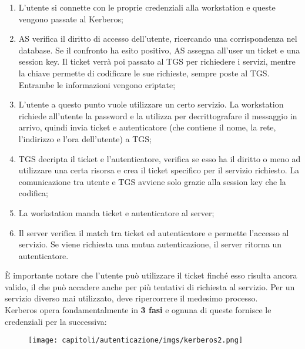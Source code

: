 \begin{enumerate}
      \item L'utente si connette con le proprie credenziali alla workstation e
            queste vengono passate al Kerberos;
      \item AS verifica il diritto di accesso dell'utente, ricercando una
            corrispondenza nel database. Se il confronto ha esito positivo, AS
            assegna all'user un ticket e una session key.
            Il ticket verrà poi passato al TGS per richiedere i servizi, mentre
            la chiave permette di codificare le sue richieste, sempre poste al TGS.
            Entrambe le informazioni vengono criptate;
      \item L'utente a questo punto vuole utilizzare un certo servizio.
            La workstation richiede all'utente la password e la utilizza per
            decrittografare il messaggio in arrivo, quindi invia ticket e
            autenticatore
            (che contiene il nome, la rete, l'indirizzo e l'ora dell'utente) a TGS;
      \item TGS decripta il ticket e l'autenticatore, verifica se esso ha il
            diritto o meno ad utilizzare una certa risorsa e crea il ticket
            specifico per il servizio richiesto. La comunicazione tra utente e
            TGS avviene solo grazie alla session key che la codifica;
      \item La workstation manda ticket e autenticatore al server;
      \item Il server verifica il match tra ticket ed autenticatore e permette
            l'accesso al servizio. Se
            viene richiesta una mutua autenticazione, il server ritorna un
            autenticatore.
\end{enumerate}

È importante notare che l'utente può utilizzare il ticket finché esso risulta
ancora valido, il che può accadere anche per più tentativi di richiesta al servizio.
Per un servizio diverso mai utilizzato, deve ripercorrere il medesimo processo.\\

Kerberos opera fondamentalmente in \textbf{3 fasi} e ognuna di queste fornisce
le credenziali per la successiva:

\begin{figure}[H]
      \centering
      \texttt{[image: capitoli/autenticazione/imgs/kerberos2.png]}
\end{figure}

